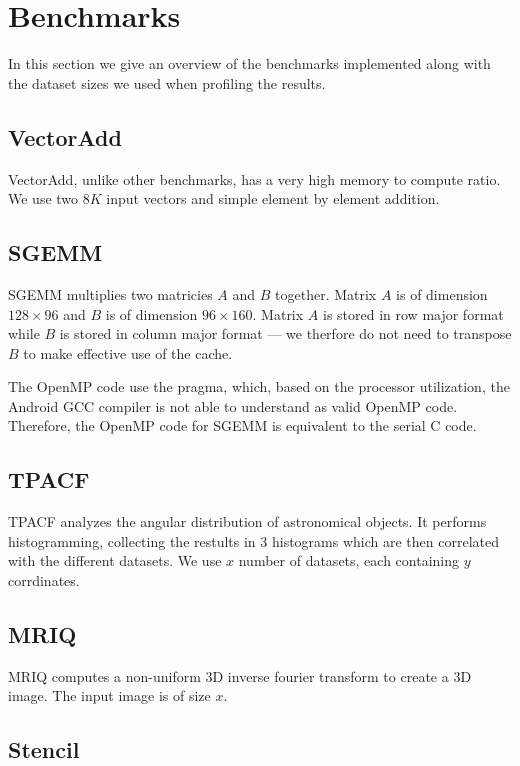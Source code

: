 \section{Benchmarks}

In this section we give an overview of the benchmarks implemented along with 
	the dataset sizes we used when profiling the results.

\subsection{VectorAdd}

VectorAdd, unlike other benchmarks, has a very high memory to compute ratio.
We use two $8K$ input vectors and simple element by element addition.

\subsection{SGEMM}


SGEMM multiplies two matricies $A$ and $B$ together.
Matrix $A$ is of dimension $128 \times 96$ and $B$ is of dimension $96 \times 160$.
Matrix $A$ is stored in row major format while $B$ is stored in column major format --- we therfore do not need to transpose $B$ to make effective use of the cache.

The OpenMP code use the  pragma, which, based on the processor utilization, the Android GCC compiler is not able to understand as valid OpenMP code.
Therefore, the OpenMP code for SGEMM is equivalent to the serial C code.

\subsection{TPACF}

TPACF analyzes the angular distribution of astronomical objects.
It performs histogramming, collecting the restults in 3 histograms which are then
	correlated with the different datasets.
We use $x$ number of datasets, each containing $y$ corrdinates.

\subsection{MRIQ}

MRIQ computes a non-uniform 3D inverse fourier transform to create a 3D image.
The input image is of size $x$.

\subsection{Stencil}

